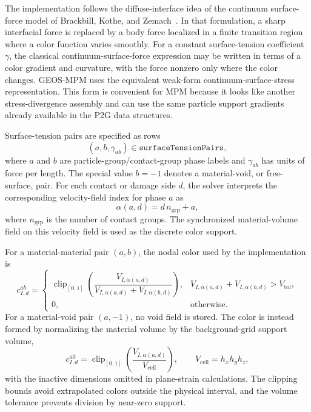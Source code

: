 The implementation follows the diffuse-interface idea of the continuum surface-force model of Brackbill, Kothe, and Zemach~\cite{brackbill1992csf}.  In that formulation, a sharp interfacial force is replaced by a body force localized in a finite transition region where a color function varies smoothly.  For a constant surface-tension coefficient $\gamma$, the classical continuum-surface-force expression may be written in terms of a color gradient and curvature, with the force nonzero only where the color changes.  GEOS-MPM uses the equivalent weak-form continuum-surface-stress representation.  This form is convenient for MPM because it looks like another stress-divergence assembly and can use the same particle support gradients already available in the P2G data structures.

Surface-tension pairs are specified as rows
\begin{equation}
  \left(a,b,\gamma_{ab}\right) \in \texttt{surfaceTensionPairs},
\end{equation}
where $a$ and $b$ are particle-group/contact-group phase labels and $\gamma_{ab}$ has units of force per length.  The special value $b=-1$ denotes a material-void, or free-surface, pair.  For each contact or damage side $d$, the solver interprets the corresponding velocity-field index for phase $a$ as
\begin{equation}
  \alpha(a,d)=d\,n_{\mathrm{grp}}+a,
\end{equation}
where $n_{\mathrm{grp}}$ is the number of contact groups.  The synchronized material-volume field on this velocity field is used as the discrete color support.

For a material-material pair $(a,b)$, the nodal color used by the implementation is
\begin{equation}
  c^{ab}_{I,d}=\begin{cases}
  \operatorname{clip}_{[0,1]}
  \left(\dfrac{V_{I,\alpha(a,d)}}{V_{I,\alpha(a,d)}+V_{I,\alpha(b,d)}}\right),
  & V_{I,\alpha(a,d)}+V_{I,\alpha(b,d)}>V_{\mathrm{tol}},\\[1.1em]
  0, & \text{otherwise}.
  \end{cases}
\end{equation}
For a material-void pair $(a,-1)$, no void field is stored.  The color is instead formed by normalizing the material volume by the background-grid support volume,
\begin{equation}
  c^{a0}_{I,d}=\operatorname{clip}_{[0,1]}
  \left(\frac{V_{I,\alpha(a,d)}}{V_{\mathrm{cell}}}\right),
  \qquad
  V_{\mathrm{cell}}=h_x h_y h_z,
\end{equation}
with the inactive dimensions omitted in plane-strain calculations.  The clipping bounds avoid extrapolated colors outside the physical interval, and the volume tolerance prevents division by near-zero support.

